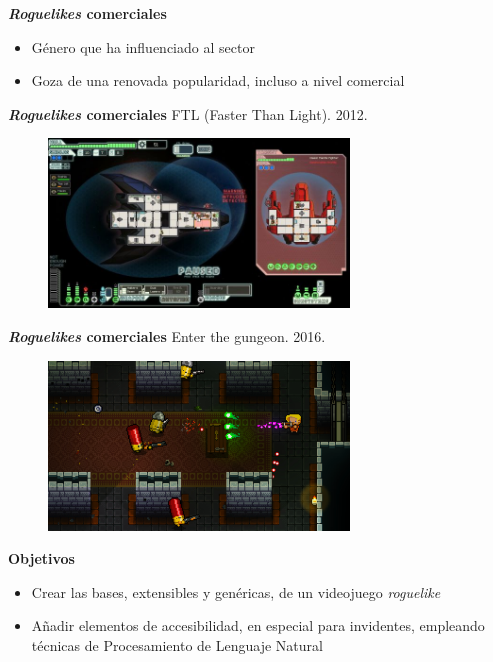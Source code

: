 \begin{tframe}{\textbf{\textit{Roguelikes} comerciales}}
	\begin{itemize}
		\item Género que ha influenciado al sector
		\item<+-| alert@+> Goza de una renovada popularidad, incluso a nivel comercial
	\end{itemize}
\end{tframe}

\begin{tframe}{\textbf{\textit{Roguelikes} comerciales}}
	FTL (Faster Than Light). 2012.
	\begin{figure}[h]
		\includegraphics[width=8cm]{../img/ftl}
	\end{figure}
\end{tframe}

\begin{tframe}{\textbf{\textit{Roguelikes} comerciales}}
	Enter the gungeon. 2016.
	\begin{figure}[h]
		\includegraphics[width=8cm]{../img/enterthegungeon}
	\end{figure}
\end{tframe}


\begin{tframe}{\textbf{Objetivos}}
	\begin{itemize}
		\item Crear las bases, extensibles y genéricas, de un videojuego \textit{roguelike}
		\item<+-| alert@+> Añadir elementos de accesibilidad, en especial para invidentes, empleando técnicas de Procesamiento de Lenguaje Natural
	\end{itemize}
\end{tframe}

